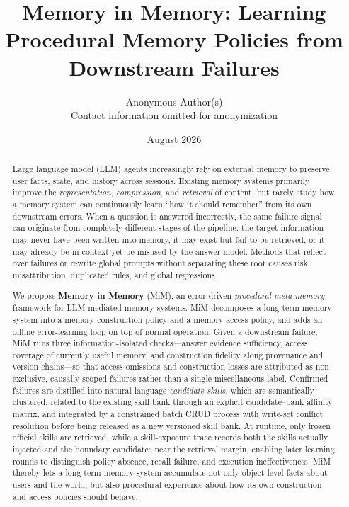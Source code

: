 \documentclass[11pt]{article}
\title{\textbf{Memory in Memory: Learning Procedural Memory Policies from Downstream Failures}}
\author{%
  Anonymous Author(s) \\
  \small Contact information omitted for anonymization
}
\date{August 2026}
\begin{document}
\maketitle

\begin{abstract}
\noindent
Large language model (LLM) agents increasingly rely on external memory to preserve
user facts, state, and history across sessions. Existing memory systems primarily
improve the \emph{representation}, \emph{compression}, and \emph{retrieval} of
content, but rarely study how a memory system can continuously learn
``how it should remember'' from its own downstream errors. When a question is
answered incorrectly, the same failure signal can originate from completely
different stages of the pipeline: the target information may never have been
written into memory, it may exist but fail to be retrieved, or it may already be
in context yet be misused by the answer model. Methods that reflect over failures
or rewrite global prompts without separating these root causes risk misattribution,
duplicated rules, and global regressions.

We propose \textbf{Memory in Memory} (MiM), an error-driven \emph{procedural
meta-memory} framework for LLM-mediated memory systems. MiM decomposes a long-term
memory system into a memory construction policy and a memory access policy, and
adds an offline error-learning loop on top of normal operation. Given a downstream
failure, MiM runs three information-isolated checks---answer evidence sufficiency,
access coverage of currently useful memory, and construction fidelity along
provenance and version chains---so that access omissions and construction losses
are attributed as non-exclusive, causally scoped failures rather than a single
miscellaneous label. Confirmed failures are distilled into natural-language
\emph{candidate skills}, which are semantically clustered, related to the existing
skill bank through an explicit candidate--bank affinity matrix, and integrated by
a constrained batch CRUD process with write-set conflict resolution before being
released as a new versioned skill bank. At runtime, only frozen official skills
are retrieved, while a skill-exposure trace records both the skills actually
injected and the boundary candidates near the retrieval margin, enabling later
learning rounds to distinguish policy absence, recall failure, and execution
ineffectiveness. MiM thereby lets a long-term memory system accumulate not only
object-level facts about users and the world, but also procedural experience
about how its own construction and access policies should behave.
\end{abstract}
\end{document}
